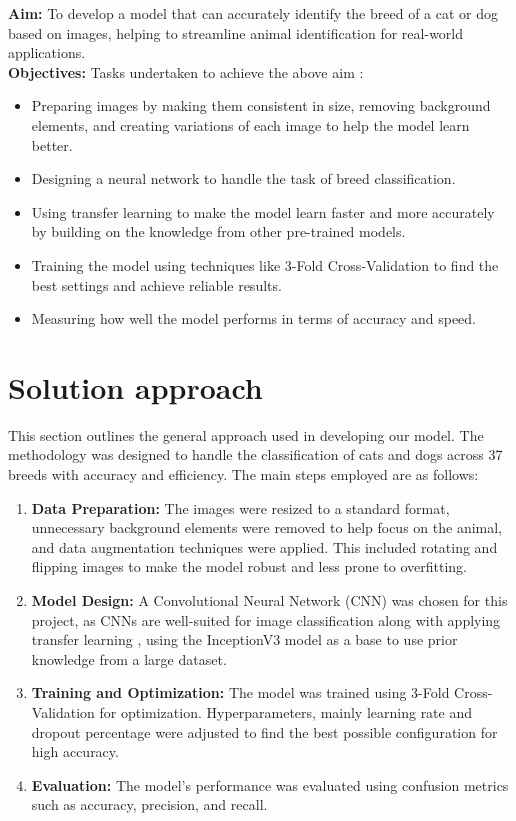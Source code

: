 \noindent
\textbf{Aim:} To develop a model that can accurately identify the breed of a cat or dog based on images, helping to streamline animal identification for real-world applications.
\\[0.2cm]
\noindent
\textbf{Objectives:} Tasks undertaken to achieve the above aim :
\begin{itemize}
    \item Preparing images by making them consistent in size, removing background elements, and creating variations of each image to help the model learn better.
    \item Designing a neural network to handle the task of breed classification.
    \item Using transfer learning to make the model learn faster and more accurately by building on the knowledge from other pre-trained models.
    \item Training the model using techniques like 3-Fold Cross-Validation to find the best settings and achieve reliable results.
    \item Measuring how well the model performs in terms of accuracy and speed.
\end{itemize}


\section{Solution approach}
\label{sec:intro_sol} 
This section outlines the general approach used in developing our model. The methodology was designed to handle the classification of cats and dogs across 37 breeds with accuracy and efficiency. The main steps employed are as follows:
\begin{enumerate}
    \item \textbf{Data Preparation:} The images were resized to a standard format, unnecessary background elements were removed to help focus on the animal, and data augmentation techniques were applied. This included rotating and flipping images to make the model robust and less prone to overfitting.
    
    \item \textbf{Model Design:} A Convolutional Neural Network (CNN) was chosen for this project, as CNNs are well-suited for image classification along with applying transfer learning , using the InceptionV3 model as a base to use prior knowledge from a large dataset.
    
    \item \textbf{Training and Optimization:} The model was trained using 3-Fold Cross-Validation for optimization. Hyperparameters, mainly learning rate and dropout percentage were adjusted to find the best possible configuration for high accuracy.
    
    \item \textbf{Evaluation:} The model's performance was evaluated using confusion metrics such as accuracy, precision, and recall.
\end{enumerate}

